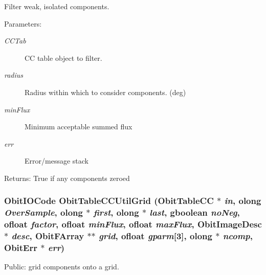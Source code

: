 Filter weak, isolated components. 

\begin{Desc}
\item[Parameters:]
\begin{description}
\item[{\em CCTab}]CC table object to filter. \item[{\em radius}]Radius within which to consider components. (deg) \item[{\em min\-Flux}]Minimum acceptable summed flux \item[{\em err}]Error/message stack \end{description}
\end{Desc}
\begin{Desc}
\item[Returns:]True if any components zeroed \end{Desc}
\subsubsection{\setlength{\rightskip}{0pt plus 5cm}Obit\-IOCode Obit\-Table\-CCUtil\-Grid ({\bf Obit\-Table\-CC} $\ast$ {\em in}, {\bf olong} {\em Over\-Sample}, {\bf olong} $\ast$ {\em first}, {\bf olong} $\ast$ {\em last}, gboolean {\em no\-Neg}, {\bf ofloat} {\em factor}, {\bf ofloat} {\em min\-Flux}, {\bf ofloat} {\em max\-Flux}, {\bf Obit\-Image\-Desc} $\ast$ {\em desc}, {\bf Obit\-FArray} $\ast$$\ast$ {\em grid}, {\bf ofloat} {\em gparm}[3], {\bf olong} $\ast$ {\em ncomp}, {\bf Obit\-Err} $\ast$ {\em err})}\label{ObitTableCCUtil_8h_a9}


Public: grid components onto a grid. 

